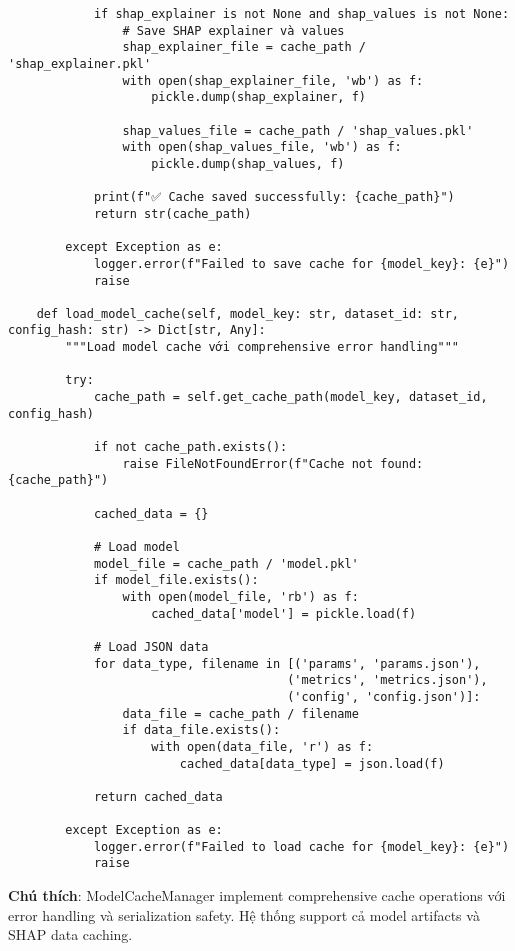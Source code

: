 \begin{verbatim}
            if shap_explainer is not None and shap_values is not None:
                # Save SHAP explainer và values
                shap_explainer_file = cache_path / 'shap_explainer.pkl'
                with open(shap_explainer_file, 'wb') as f:
                    pickle.dump(shap_explainer, f)
                
                shap_values_file = cache_path / 'shap_values.pkl'
                with open(shap_values_file, 'wb') as f:
                    pickle.dump(shap_values, f)
            
            print(f"✅ Cache saved successfully: {cache_path}")
            return str(cache_path)
            
        except Exception as e:
            logger.error(f"Failed to save cache for {model_key}: {e}")
            raise
            
    def load_model_cache(self, model_key: str, dataset_id: str, config_hash: str) -> Dict[str, Any]:
        """Load model cache với comprehensive error handling"""
        
        try:
            cache_path = self.get_cache_path(model_key, dataset_id, config_hash)
            
            if not cache_path.exists():
                raise FileNotFoundError(f"Cache not found: {cache_path}")
            
            cached_data = {}
            
            # Load model
            model_file = cache_path / 'model.pkl'
            if model_file.exists():
                with open(model_file, 'rb') as f:
                    cached_data['model'] = pickle.load(f)
            
            # Load JSON data
            for data_type, filename in [('params', 'params.json'), 
                                       ('metrics', 'metrics.json'), 
                                       ('config', 'config.json')]:
                data_file = cache_path / filename
                if data_file.exists():
                    with open(data_file, 'r') as f:
                        cached_data[data_type] = json.load(f)
            
            return cached_data
            
        except Exception as e:
            logger.error(f"Failed to load cache for {model_key}: {e}")
            raise
\end{verbatim}

\textbf{Chú thích}: ModelCacheManager implement comprehensive cache operations với error handling và serialization safety. Hệ thống support cả model artifacts và SHAP data caching.

